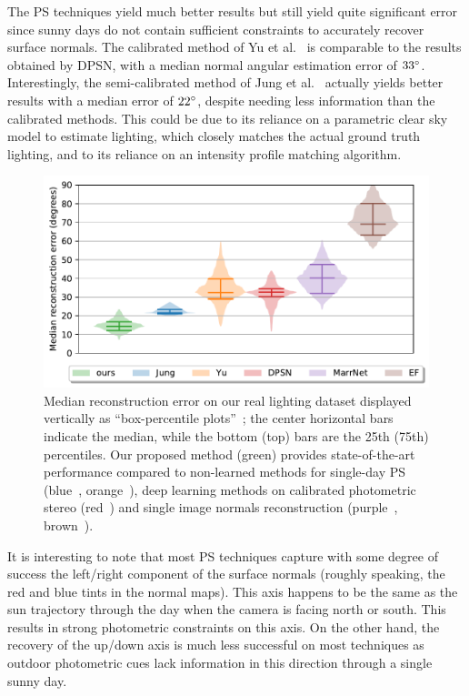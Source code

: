 The PS techniques yield much better results but still yield quite significant error since sunny days do not contain sufficient constraints to accurately recover surface normals. The calibrated method of Yu et al.~\cite{yu-iccp-13} is comparable to the results obtained by DPSN, with a median normal angular estimation error of $33^{\circ}$. Interestingly, the semi-calibrated method of Jung et al.~\cite{jung-cvpr-15} actually yields better results with a median error of $22^{\circ}$, despite needing less information than the calibrated methods. This could be due to its reliance on a parametric clear sky model to estimate lighting, which closely matches the actual ground truth lighting, and to its reliance on an intensity profile matching algorithm.


\begin{figure}[t]
\centering
\includegraphics[width=0.75\linewidth]{figures/results/real_lighting_performance.pdf}
\caption[Reconstruction error on real lighting]{Median reconstruction error on our real lighting dataset displayed vertically as “box-percentile plots”~\cite{esty-jss-03}; the center horizontal bars indicate the median, while the bottom (top) bars are the 25th (75th) percentiles. Our proposed method (green) provides state-of-the-art performance compared to non-learned methods for single-day PS (blue~\cite{jung-cvpr-15}, orange~\cite{yu-iccp-13}), deep learning methods on calibrated photometric stereo (red~\cite{santo-iccv-17}) and single image normals reconstruction (purple~\cite{wu-nips-17}, brown~\cite{eigen-iccv-15}).}
\label{fig:results-quantitative}
\end{figure}

It is interesting to note that most PS techniques capture with some degree of success the left/right component of the surface normals (roughly speaking, the red and blue tints in the normal maps). This axis happens to be the same as the sun trajectory through the day when the camera is facing north or south. This results in strong photometric constraints on this axis. On the other hand, the recovery of the up/down axis is much less successful on most techniques as outdoor photometric cues lack information in this direction through a single sunny day.

